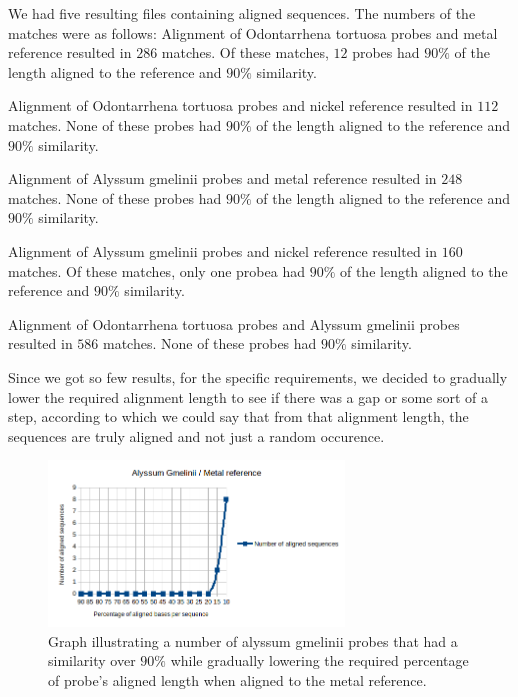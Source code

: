We had five resulting files containing aligned sequences. 
The numbers of the matches were as follows: 
Alignment of Odontarrhena tortuosa probes and metal reference resulted in $286$ matches. Of these matches, $12$ probes had $90\%$ of the length aligned to the reference and $90\%$ similarity. 

Alignment of Odontarrhena tortuosa probes and nickel reference resulted in $112$ matches. None of these probes had $90\%$ of the length aligned to the reference and $90\%$ similarity. 

Alignment of Alyssum gmelinii probes and metal reference resulted in $248$ matches. None of these probes had $90\%$ of the length aligned to the reference and $90\%$ similarity. 

Alignment of Alyssum gmelinii probes and nickel reference resulted in $160$ matches. Of these matches, only one probea had $90\%$ of the length aligned to the reference and $90\%$ similarity. 

Alignment of Odontarrhena tortuosa probes and Alyssum gmelinii probes resulted in $586$ matches. None of these probes had $90\%$ similarity. 


Since we got so few results, for the specific requirements, we decided to gradually lower the required alignment length to see if there was a gap or some sort of a step, according to which we could 
say that from that alignment length, the sequences are truly aligned and not just a random occurence. 

\begin{figure}
\centerline{
	\includegraphics[width=0.7\textwidth]{images/gmelinii_metal.png}
}
\caption[Lowering of the required alignment length for succesful alignment]{Graph illustrating a number of alyssum gmelinii probes that had a similarity over $90\%$ while gradually lowering the required percentage of probe's aligned length when aligned to the metal reference.}
\label{obr:gmel_met}
\end{figure}

